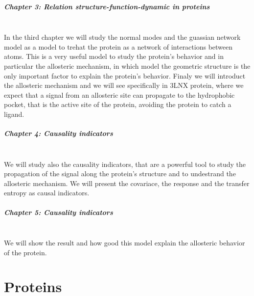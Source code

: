 \documentclass[English, Lau, oneside]{sapthesis}
\begin{document}
\paragraph{Chapter 3: Relation structure-function-dynamic in proteins} \\
In the third chapter we will study the normal modes and the guassian network model as a model to trehat the protein as a network of interactions between atoms.
This is a very useful model to study the protein's behavior and in particular the allosteric mechanism, in which model the geometric structure is the only important factor to explain the protein's behavior.
Finaly we will introduct the allosteric mechanism and we will see specifically in 3LNX protein, where we expect that a signal from an allosteric site can propagate to the hydrophobic pocket, that is the active site of the protein, avoiding the protein to catch a ligand.\\


\paragraph{Chapter 4: Causality indicators} \\
We will study also the causality indicators, that are a powerful tool to study the propagation of the signal along the protein's structure and to undestrand the allosteric mechanism.
We will present the covariace, the response and the transfer entropy as causal indicators.
\paragraph{Chapter 5: Causality indicators} \\
We will show the result and how good this model explain the allosteric behavior of the protein.

\vspace{1cm}








\chapter{Proteins}
\end{document}
